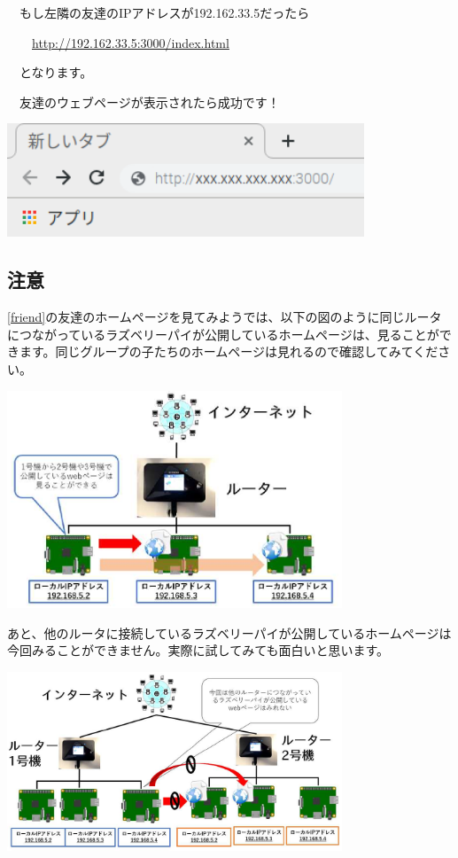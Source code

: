 \documentclass[a4paper,12pt,dvipdfmx]{jarticle}
\begin{document}
\ \ もし左隣の友達のIPアドレスが192.162.33.5だったら

\ \ 　\url{http://192.162.33.5:3000/index.html}

\ \ となります。

\ \ 友達のウェブページが表示されたら成功です！


\bigskip


\centering
\includegraphics[width=10.659cm]{ome7-img043.png}
\flushleft

\clearpage\subsection*{\bfseries
	注意}

	\ref{friend}の友達のホームページを見てみようでは、以下の図のように同じルータにつながっているラズベリーパイが公開しているホームページは、見ることができます。同じグループの子たちのホームページは見れるので確認してみてください。

\centering
\includegraphics[width=0.75\textwidth]{ome7-img044}
\flushleft


\bigskip



あと、他のルータに接続しているラズベリーパイが公開しているホームページは今回みることができません。実際に試してみても面白いと思います。


\bigskip

\centering
\includegraphics[width=0.75\textwidth]{ome7-img045}
\flushleft
\end{document}
